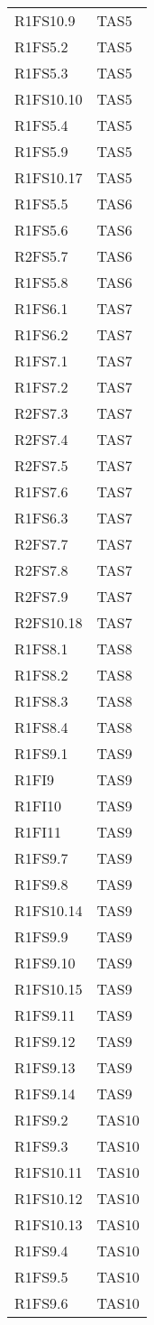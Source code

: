 {\begin{longtable}{C{4cm} C{4cm}}
R1FS10.9 & TAS5 \\
R1FS5.2 & TAS5 \\
R1FS5.3 & TAS5 \\
R1FS10.10 & TAS5 \\
R1FS5.4 & TAS5 \\
R1FS5.9 & TAS5 \\
R1FS10.17 & TAS5 \\
R1FS5.5 & TAS6 \\
R1FS5.6 & TAS6 \\
R2FS5.7 & TAS6 \\
R1FS5.8 & TAS6 \\
R1FS6.1 & TAS7 \\
R1FS6.2 & TAS7 \\
R1FS7.1 & TAS7 \\
R1FS7.2 & TAS7 \\
R2FS7.3 & TAS7 \\
R2FS7.4 & TAS7 \\
R2FS7.5 & TAS7 \\
R1FS7.6 & TAS7 \\
R1FS6.3 & TAS7 \\
R2FS7.7 & TAS7 \\
R2FS7.8 & TAS7 \\
R2FS7.9 & TAS7 \\
R2FS10.18 & TAS7 \\
R1FS8.1 & TAS8 \\
R1FS8.2 & TAS8 \\
R1FS8.3 & TAS8 \\
R1FS8.4 & TAS8 \\
R1FS9.1 & TAS9 \\
R1FI9 & TAS9 \\
R1FI10 & TAS9 \\
R1FI11 & TAS9 \\
R1FS9.7 & TAS9 \\
R1FS9.8 & TAS9 \\
R1FS10.14 & TAS9 \\
R1FS9.9 & TAS9 \\
R1FS9.10 & TAS9 \\
R1FS10.15 & TAS9 \\
R1FS9.11 & TAS9 \\
R1FS9.12 & TAS9 \\
R1FS9.13 & TAS9 \\
R1FS9.14 & TAS9 \\
R1FS9.2 & TAS10 \\
R1FS9.3 & TAS10 \\
R1FS10.11 & TAS10 \\
R1FS10.12 & TAS10 \\
R1FS10.13 & TAS10 \\
R1FS9.4 & TAS10 \\
R1FS9.5 & TAS10 \\
R1FS9.6 & TAS10 \\

\end{longtable}
}






















